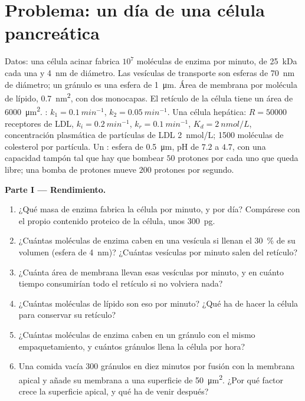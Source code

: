 \section{Problema: un día de una célula pancreática}

\begin{problem}
\label{pb:b3:membrane-traffic:1}
Datos: una célula acinar fabrica $10^{7}$ moléculas de enzima por minuto,
de \qty{25}{kDa} cada una y \qty{4}{nm} de diámetro. Las vesículas de
transporte son esferas de \qty{70}{nm} de diámetro; un gránulo es una
esfera de \qty{1}{\micro m}. Área de membrana por molécula de lípido,
\qty{0.7}{nm^2}, con dos monocapas. El retículo de la célula tiene un
área de \qty{6000}{\micro m^2}. :
$k_{1} = \qty{0.1}{min^{-1}}$, $k_{2} = \qty{0.05}{min^{-1}}$. Una célula
hepática: $R = \num{50000}$ receptores de LDL,
$k_{i} = \qty{0.2}{min^{-1}}$, $k_{r} = \qty{0.1}{min^{-1}}$,
$K_{d} = \qty{2}{nmol/L}$, concentración plasmática de partículas de LDL
\qty{2}{nmol/L}; \num{1500} moléculas de colesterol por partícula.
Un : esfera de \qty{0.5}{\micro m}, pH de $7.2$ a $4.7$, con una
capacidad tampón tal que hay que bombear $50$ protones por cada uno que
queda libre; una bomba de protones mueve $200$ protones por segundo.

\medskip
\noindent\textbf{Parte I --- Rendimiento.}
\begin{enumerate}
  \item ¿Qué masa de enzima fabrica la célula por minuto, y por día?
        Compárese con el propio contenido proteico de la célula, unos
        \qty{300}{pg}.
  \item ¿Cuántas moléculas de enzima caben en una vesícula si llenan el
        \qty{30}{\%} de su volumen (esfera de \qty{4}{nm})? ¿Cuántas
        vesículas por minuto salen del retículo?
  \item ¿Cuánta área de membrana llevan esas vesículas por minuto, y en
        cuánto tiempo consumirían todo el retículo si no volviera nada?
  \item ¿Cuántas moléculas de lípido son eso por minuto? ¿Qué ha de
        hacer la célula para conservar su retículo?
  \item ¿Cuántas moléculas de enzima caben en un gránulo con el mismo
        empaquetamiento, y cuántos gránulos llena la célula por hora?
  \item Una comida vacía $300$ gránulos en diez minutos por fusión con
        la membrana apical y añade su membrana a una superficie de
        \qty{50}{\micro m^2}. ¿Por qué factor crece la superficie
        apical, y qué ha de venir después?
\end{enumerate}


\end{problem}
